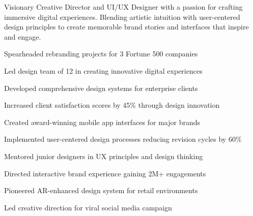 \documentclass[darkmode,withhyper]{gamifiedcv}
\begin{document}
\begin{paracol}{2}

Visionary Creative Director and UI/UX Designer with a passion for crafting immersive digital 
experiences. Blending artistic intuition with user-centered design principles to create 
memorable brand stories and interfaces that inspire and engage.
\vspace{1em}


\begin{jobdescription}
    \item Spearheaded rebranding projects for 3 Fortune 500 companies
    \item Led design team of 12 in creating innovative digital experiences
    \item Developed comprehensive design systems for enterprise clients
    \item Increased client satisfaction scores by 45\% through design innovation
\end{jobdescription}

\begin{jobdescription}
    \item Created award-winning mobile app interfaces for major brands
    \item Implemented user-centered design processes reducing revision cycles by 60\%
    \item Mentored junior designers in UX principles and design thinking
\end{jobdescription}


\begin{jobdescription}
    \item Directed interactive brand experience gaining 2M+ engagements
    \item Pioneered AR-enhanced design system for retail environments
    \item Led creative direction for viral social media campaign
\end{jobdescription}


\end{paracol}
\end{document}
